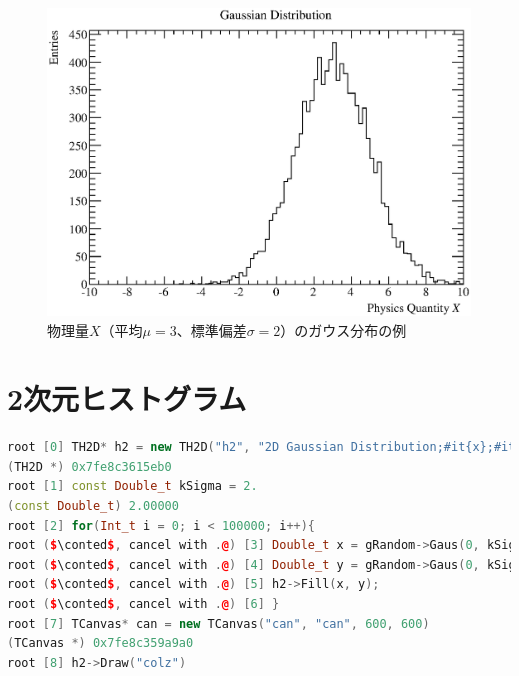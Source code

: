 \begin{figure}
  \centering
  \includegraphics[width=12cm,clip]{fig/TH1D.eps}
  \caption{物理量$X$（平均$\mu = 3$、標準偏差$\sigma = 2$）のガウス分布の例}
  \label{fig_TH1D_eps}
\end{figure}

\section{2次元ヒストグラム}

\begin{lstlisting}[language=c++,breaklines=true,mathescape]
root [0] TH2D* h2 = new TH2D("h2", "2D Gaussian Distribution;#it{x};#it{y};Entries", 100, -10, 10, 100, -10, 10)
(TH2D *) 0x7fe8c3615eb0
root [1] const Double_t kSigma = 2.
(const Double_t) 2.00000
root [2] for(Int_t i = 0; i < 100000; i++){
root ($\conted$, cancel with .@) [3] Double_t x = gRandom->Gaus(0, kSigma);
root ($\conted$, cancel with .@) [4] Double_t y = gRandom->Gaus(0, kSigma);
root ($\conted$, cancel with .@) [5] h2->Fill(x, y);
root ($\conted$, cancel with .@) [6] }
root [7] TCanvas* can = new TCanvas("can", "can", 600, 600)
(TCanvas *) 0x7fe8c359a9a0
root [8] h2->Draw("colz")
\end{lstlisting}

